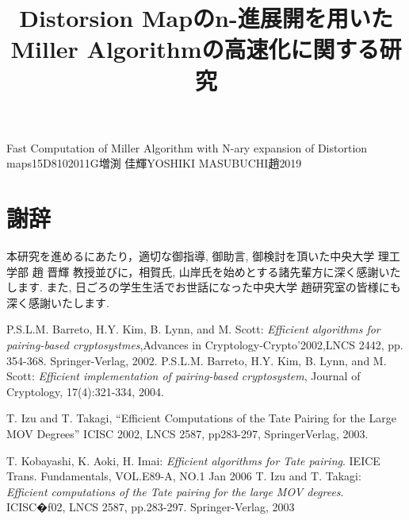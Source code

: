 \documentclass[a4j,oneside,openany]{jsbook}
\begin{document}

\title{Distorsion Mapのn-進展開を用いた　Miller Algorithmの高速化に関する研究}{Fast Computation of Miller Algorithm with N-ary expansion of Distortion maps}{15D8102011G}{増渕 佳輝}{YOSHIKI MASUBUCHI}{趙}{2019}

\setcounter{page}{1}


\newpage

\tableofcontents
\newpage











\chapter*{謝辞}
本研究を進めるにあたり，適切な御指導, 御助言, 御検討を頂いた中央大学 理工学部 趙 晋輝 教授並びに，相賀氏, 山岸氏を始めとする諸先輩方に深く感謝いたします. また, 日ごろの学生生活でお世話になった中央大学 趙研究室の皆様にも深く感謝いたします.


\begin{thebibliography}{99}
	 P.S.L.M. Barreto, H.Y. Kim, B. Lynn, and M. Scott: {\em Efficient algorithms for pairing-based cryptosystmes},Advances in Cryptology-Crypto'2002,LNCS 2442, pp. 354-368. Springer-Verlag, 2002.
	 P.S.L.M. Barreto, H.Y. Kim, B. Lynn, and M. Scott: {\em Efficient implementation of pairing-based cryptosystem}, Journal of Cryptology, 17(4):321-334, 2004.

   T. Izu and T. Takagi, “Efficient Computations of the Tate Pairing for the Large MOV Degrees” ICISC 2002, LNCS 2587, pp283-297, SpringerVerlag, 2003.


	 T. Kobayashi, K. Aoki, H. Imai: {\em Efficient algorithms for Tate pairing}. IEICE Trans. Fundamentals, VOL.E89-A, NO.1 Jan 2006
	 T. Izu and T. Takagi: {\em Efficient computations of the Tate pairing for the large MOV degrees}. ICISC�f02, LNCS 2587, pp.283-297. Springer-Verlag, 2003

\end{thebibliography}
\end{document}

